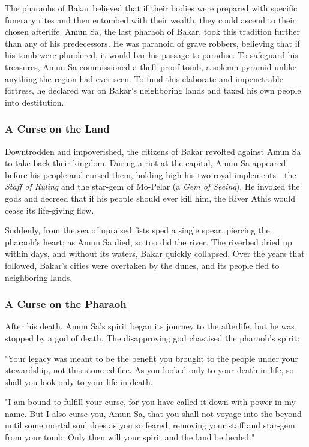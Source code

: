 \documentclass[10pt,a4paper,twoside,bg=print,twocolumn,openany,nodeprecatedcode]{dndbook}
\begin{document}
The pharaohs of Bakar believed that if their bodies were prepared with specific funerary rites and then entombed with their wealth, they could ascend to their chosen afterlife. Amun Sa, the last pharaoh of Bakar, took this tradition further than any of his predecessors. He was paranoid of grave robbers, believing that if his tomb were plundered, it would bar his passage to paradise. To safeguard his treasures, Amun Sa commissioned a theft-proof tomb, a solemn pyramid unlike anything the region had ever seen. To fund this elaborate and impenetrable fortress, he declared war on Bakar's neighboring lands and taxed his own people into destitution.

\subsubsection{A Curse on the Land}
Downtrodden and impoverished, the citizens of Bakar revolted against Amun Sa to take back their kingdom. During a riot at the capital, Amun Sa appeared before his people and cursed them, holding high his two royal implements—the \textit{Staff of Ruling} and the star-gem of Mo-Pelar (a \textit{Gem of Seeing}). He invoked the gods and decreed that if his people should ever kill him, the River Athis would cease its life-giving flow.

Suddenly, from the sea of upraised fists sped a single spear, piercing the pharaoh's heart; as Amun Sa died, so too did the river. The riverbed dried up within days, and without its waters, Bakar quickly collapsed. Over the years that followed, Bakar's cities were overtaken by the dunes, and its people fled to neighboring lands.

\subsubsection{A Curse on the Pharaoh}
After his death, Amun Sa's spirit began its journey to the afterlife, but he was stopped by a god of death. The disapproving god chastised the pharaoh's spirit:

"Your legacy was meant to be the benefit you brought to the people under your stewardship, not this stone edifice. As you looked only to your death in life, so shall you look only to your life in death.

"I am bound to fulfill your curse, for you have called it down with power in my name. But I also curse you, Amun Sa, that you shall not voyage into the beyond until some mortal soul does as you so feared, removing your staff and star-gem from your tomb. Only then will your spirit and the land be healed."
\end{document}
